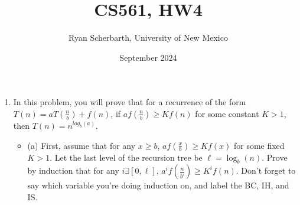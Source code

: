 \documentclass{article}
\title{CS561, HW4}
\author{Ryan Scherbarth, University of New Mexico}
\date{September 2024}
\begin{document}
\maketitle

\begin{enumerate}


\item In this problem, you will prove that for a recurrence of the form $T(n) = aT(\frac{n}{b}) + f(n)$, if $af(\frac{n}{b}) \geq Kf(n)$ for some constant $K>1$, then $T(n) = n^{log_{b}(a)}$.
\begin{itemize}
\item (a) First, assume that for any $x \geq b$, $af(\frac{x}{b}) \geq Kf(x)$ for some fixed $K>1$. Let the last level of the recursion tree be $\ell = \log_{b}(n)$. Prove by induction that for any $i \exists [0, \ell]$, $a^{i}f(\frac{n}{b^{i}}) \geq K^{i}f(n)$. Don't forget to say which variable you're doing induction on, and label the BC, IH, and IS.
\end{itemize}



\end{enumerate}
\end{document}
